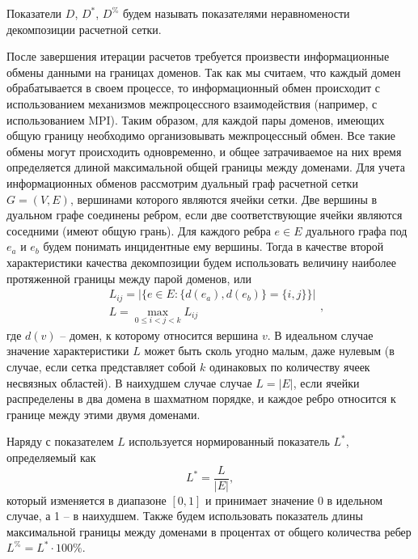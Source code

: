 \begin{definition}
Показатели $D$, $D^{*}$, $D^{\%}$ будем называть показателями неравномености декомпозиции расчетной сетки.
\end{definition} 

После завершения итерации расчетов требуется произвести информационные обмены данными на границах доменов.
Так как мы считаем, что каждый домен обрабатывается в своем процессе, то информационный обмен происходит с использованием механизмов межпроцессного взаимодействия (например, с использованием MPI).
Таким образом, для каждой пары доменов, имеющих общую границу необходимо организовывать межпроцессный обмен.
Все такие обмены могут происходить одновременно, и общее затрачиваемое на них время определяется длиной максимальной общей границы между доменами.
Для учета информационных обменов рассмотрим дуальный граф расчетной сетки $G = (V, E)$, вершинами которого являются ячейки сетки.
Две вершины в дуальном графе соединены ребром, если две соответствующие ячейки являются соседними (имеют общую грань).
Для каждого ребра $e \in E$ дуального графа под $e_a$ и $e_b$ будем понимать инцидентные ему вершины.
Тогда в качестве второй характеристики качества декомпозиции будем использовать величину наиболее протяженной границы между парой доменов, или
\begin{equation}
	\begin{aligned}
		& L_{ij} = \left| \{ e \in E: \{ d(e_a), d(e_b) \} = \{ i, j \} \} \right| \\
		& L = \max_{0 \le i < j < k}{L_{ij}}
	\end{aligned},
\end{equation}
где $d(v)$ -- домен, к которому относится вершина $v$.
В идеальном случае значение характеристики $L$ может быть сколь угодно малым, даже нулевым (в случае, если сетка представляет собой $k$ одинаковых по количеству ячеек несвязных областей).
В наихудшем случае случае $L = |E|$, если ячейки распределены в два домена в шахматном порядке, и каждое ребро относится к границе между этими двумя доменами.

Наряду с показателем $L$ используется нормированный показатель $L^{*}$, определяемый как
\begin{equation}
	L^{*} = \frac{L}{|E|},
\end{equation}
который изменяется в диапазоне $[0, 1]$ и принимает значение 0 в идельном случае, а 1 -- в наихудшем.
Также будем использовать показатель длины максимальной границы между доменами в процентах от общего количества ребер $L^{\%} = L^{*} \cdot 100\%$.

